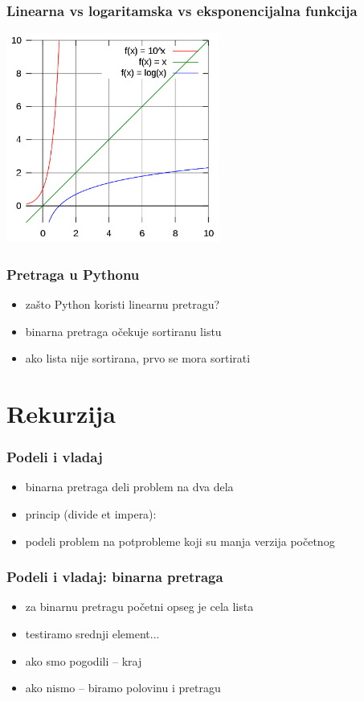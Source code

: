 \documentclass[utf8,compress]{beamer}
\begin{document}
\begin{frame}[fragile]
  \frametitle{Linearna vs logaritamska vs eksponencijalna funkcija}
  \begin{center}
    \includegraphics[width=7cm]{pic25}
  \end{center}
\end{frame}

\begin{frame}[fragile]
  \frametitle{Pretraga u Pythonu}
  \begin{itemize}
    \item zašto Python koristi linearnu pretragu?
    \item binarna pretraga očekuje sortiranu listu
    \item ako lista nije sortirana, prvo se mora sortirati
  \end{itemize}
\end{frame}

\section[Rekurzija]{Rekurzija}

\begin{frame}[fragile]
  \frametitle{Podeli i vladaj}
  \begin{itemize}
    \item binarna pretraga deli problem na dva dela
    \item princip  (divide et impera):
    \item podeli problem na potprobleme koji su manja verzija početnog
  \end{itemize}
\end{frame}

\begin{frame}[fragile]
  \frametitle{Podeli i vladaj: binarna pretraga}
  \begin{itemize}
    \item za binarnu pretragu početni opseg je cela lista
    \item testiramo srednji element...
    \item ako smo pogodili -- kraj
    \item ako nismo -- biramo polovinu i  pretragu
  \end{itemize}
\end{frame}
\end{document}

